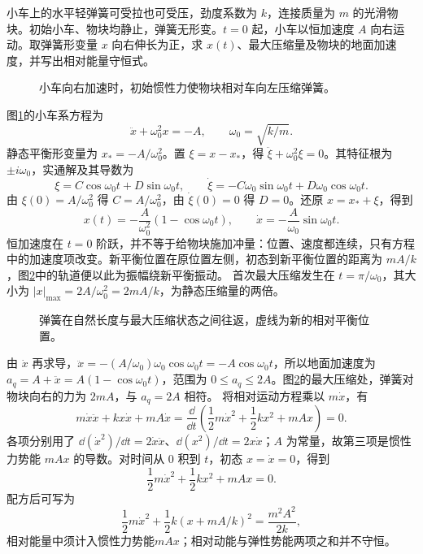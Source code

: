 \begin{exercise}[加速度阶跃下的弹簧压缩]\label{rot:problem-exercise-3}\label{rot:ex:d6-h3}
小车上的水平轻弹簧可受拉也可受压，劲度系数为 $k$，连接质量为 $m$ 的光滑物块。初始小车、物块均静止，弹簧无形变。$t=0$ 起，小车以恒加速度 $A$ 向右运动。取弹簧形变量 $x$ 向右伸长为正，求 $x(t)$、最大压缩量及物块的地面加速度，并写出相对能量守恒式。
\end{exercise}
\begin{figure}[H]\centering
{}
\caption{小车向右加速时，初始惯性力使物块相对车向左压缩弹簧。}\label{rot:fig:d6-h3-q}
\end{figure}
\begin{solution}
图\ref{rot:fig:d6-h3-q}的小车系方程为
\[
\ddot x+\omega_0^2x=-A,\qquad \omega_0=\sqrt{k/m}.
\]
静态平衡形变量为 $x_*=-A/\omega_0^2$。置 $\xi=x-x_*$，得 $\ddot\xi+\omega_0^2\xi=0$。其特征根为 $\pm i\omega_0$，实通解及其导数为
\[
\xi=C\cos\omega_0t+D\sin\omega_0t,\qquad
\dot\xi=-C\omega_0\sin\omega_0t+D\omega_0\cos\omega_0t.
\]
由 $\xi(0)=A/\omega_0^2$ 得 $C=A/\omega_0^2$，由 $\dot\xi(0)=0$ 得 $D=0$。还原 $x=x_*+\xi$，得到
\[
x(t)=-\frac A{\omega_0^2}(1-\cos\omega_0t),\qquad
\dot x=-\frac A{\omega_0}\sin\omega_0t.
\]
恒加速度在 $t=0$ 阶跃，并不等于给物块施加冲量：位置、速度都连续，只有方程中的加速度项改变。新平衡位置在原位置左侧，初态到新平衡位置的距离为 $mA/k$，图\ref{rot:fig:d6-h3-s}中的轨道便以此为振幅绕新平衡振动。
首次最大压缩发生在 $t=\pi/\omega_0$，其大小为
$|x|_{\max}=2A/\omega_0^2=2mA/k$，为静态压缩量的两倍。
\begin{figure}[H]\centering
{}
\caption{弹簧在自然长度与最大压缩状态之间往返，虚线为新的相对平衡位置。}\label{rot:fig:d6-h3-s}
\end{figure}
由 $\dot x$ 再求导，$\ddot x=-(A/\omega_0)\omega_0\cos\omega_0t=-A\cos\omega_0t$，所以地面加速度为 $a_q=A+\ddot x=A(1-\cos\omega_0t)$，范围为 $0\le a_q\le2A$。图\ref{rot:fig:d6-h3-s}的最大压缩处，弹簧对物块向右的力为 $2mA$，与 $a_q=2A$ 相符。
将相对运动方程乘以 $m\dot x$，有
\[
m\dot x\ddot x+kx\dot x+mA\dot x
=\frac{\dd}{\dd t}\left(\frac12m\dot x^2+\frac12kx^2+mAx\right)=0.
\]
各项分别用了 $\dd(\dot x^2)/\dd t=2\dot x\ddot x$、$\dd(x^2)/\dd t=2x\dot x$；$A$ 为常量，故第三项是惯性力势能 $mAx$ 的导数。对时间从 $0$ 积到 $t$，初态 $x=\dot x=0$，得到
\[
\frac12m\dot x^2+\frac12kx^2+mAx=0.
\]
配方后可写为
\[
\frac12m\dot x^2+\frac12k(x+mA/k)^2=\frac{m^2A^2}{2k},
\]
相对能量中须计入惯性力势能$mAx$；相对动能与弹性势能两项之和并不守恒。
\end{solution}


